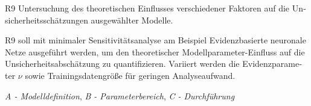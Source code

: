 \begin{otherlanguage}{ngerman}
\pagebreak


R9 Untersuchung des theoretischen Einflusses verschiedener Faktoren auf die Unsicherheitsschätzungen ausgewählter Modelle.

R9 soll mit minimaler Sensitivitätsanalyse am Beispiel \gls{Evidenzbasierte neuronale Netze} ausgeführt werden, um den theoretischer Modellparameter-Einfluss auf die Unsicherheitsabschätzung zu quantifizieren. Variiert werden die Evidenzparameter $\nu$ sowie Trainingsdatengröße für geringen Analyseaufwand.



\textit{A - Modelldefinition}, \textit{B - Parameterbereich}, \textit{C - Durchführung}


\end{otherlanguage}
